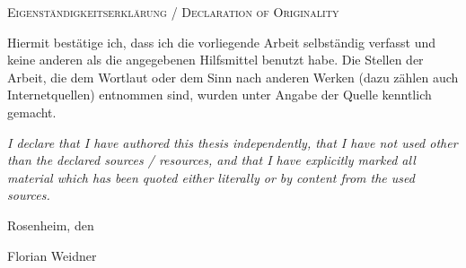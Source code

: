{
	\large
	\thispagestyle{empty}
	\vspace*{\fill}
	
	\noindent
	\textsc{Eigenständigkeitserklärung / Declaration of Originality}
	
	\medskip
	
	\noindent
	Hiermit bestätige ich, dass ich die vorliegende Arbeit selbständig verfasst und keine anderen als die angegebenen Hilfsmittel benutzt habe. Die Stellen der Arbeit, die dem Wortlaut oder dem Sinn nach anderen Werken (dazu zählen auch Internetquellen) entnommen sind, wurden unter Angabe der Quelle kenntlich gemacht.
	
	\medskip
	
	\textit{I declare that I have authored this thesis independently, that I have not used other than the declared sources / resources, and that I have explicitly marked all material which has been quoted either literally or by content from the used sources.}
	
	\bigskip
	
	\noindent
	Rosenheim, den 
	
	\vspace*{2cm}
	
	\noindent
	Florian Weidner
}


